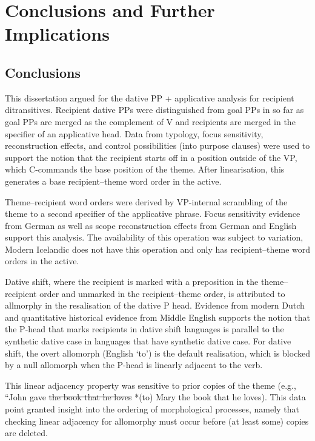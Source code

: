 \chapter{Conclusions and Further Implications}
\section{Conclusions}
This dissertation argued for the dative PP + applicative analysis for recipient ditransitives. Recipient dative PPs were distinguished from goal PPs in so far as goal PPs are merged as the complement of V and recipients are merged in the specifier of an applicative head. Data from typology, focus sensitivity, reconstruction effects, and control possibilities (into purpose clauses) were used to support the notion that the recipient starts off in a position outside of the VP, which C-commands the base position of the theme. After linearisation, this generates a base recipient--theme word order in the active.

Theme--recipient word orders were derived by VP-internal scrambling of the theme to a second specifier of the applicative phrase. Focus sensitivity evidence from German as well as scope reconstruction effects from German and English support this analysis. The availability of this operation was subject to variation, Modern Icelandic does not have this operation and only has recipient--theme word orders in the active. 

Dative shift, where the recipient is marked with a preposition in the theme--recipient order and unmarked in the recipient--theme order, is attributed to allmorphy in the resalisation of the dative P head. Evidence from modern Dutch and quantitative historical evidence from Middle English supports the notion that the P-head that marks recipients in dative shift languages is parallel to the synthetic dative case in languages that have synthetic dative case. For dative shift, the overt allomorph (English `to') is the default realisation, which is blocked by a null allomorph when the P-head is linearly adjacent to the verb.

This linear adjacency property was sensitive to prior copies of the theme (e.g., ``John gave \sout{the book that he loves} *(to) Mary the book that he loves). This data point granted insight into the ordering of morphological processes, namely that checking linear adjacency for allomorphy must occur before (at least some) copies are deleted.

